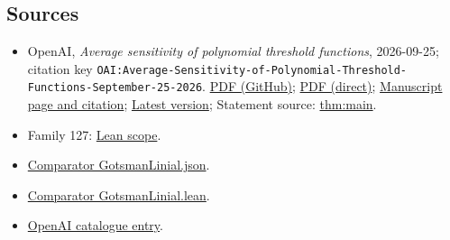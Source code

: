 \documentclass[11pt]{article}
\begin{document}
\subsection{Sources}
\begin{itemize}
\item OpenAI, \emph{Average sensitivity of polynomial threshold functions}, 2026-09-25; citation key \texttt{OAI:Average-Sensitivity-of-Polynomial-Threshold-Functions-September-25-2026}. \href{https://github.com/openai/math/blob/adc7f1241b42e322a6451854ab7e4b4c146bf78a/preprints/Average-Sensitivity-of-Polynomial-Threshold-Functions-September-25-2026/main.pdf}{PDF (GitHub)}; \href{https://github.com/openai/math/raw/adc7f1241b42e322a6451854ab7e4b4c146bf78a/preprints/Average-Sensitivity-of-Polynomial-Threshold-Functions-September-25-2026/main.pdf}{PDF (direct)}; \href{https://github.com/openai/math/blob/adc7f1241b42e322a6451854ab7e4b4c146bf78a/preprints/Average-Sensitivity-of-Polynomial-Threshold-Functions-September-25-2026/README.md}{Manuscript page and citation}; \href{https://github.com/openai/math/blob/main/preprints/Average-Sensitivity-of-Polynomial-Threshold-Functions-September-25-2026/main.pdf}{Latest version}; Statement source: \href{https://github.com/openai/math/blob/adc7f1241b42e322a6451854ab7e4b4c146bf78a/preprints/Average-Sensitivity-of-Polynomial-Threshold-Functions-September-25-2026/build/sections/01-introduction.tex\#L20}{thm:main}.
\item Family 127: \href{https://github.com/openai/math/blob/adc7f1241b42e322a6451854ab7e4b4c146bf78a/lean/docs/127.md}{Lean scope}.
\item \href{https://github.com/openai/math/blob/adc7f1241b42e322a6451854ab7e4b4c146bf78a/lean/ComparatorChallenges/GotsmanLinial.json}{Comparator GotsmanLinial.json}.
\item \href{https://github.com/openai/math/blob/adc7f1241b42e322a6451854ab7e4b4c146bf78a/lean/ComparatorChallenges/GotsmanLinial.lean}{Comparator GotsmanLinial.lean}.
\item \href{https://github.com/openai/math/blob/adc7f1241b42e322a6451854ab7e4b4c146bf78a/CONTENTS.md}{OpenAI catalogue entry}.
\end{itemize}
\end{document}
